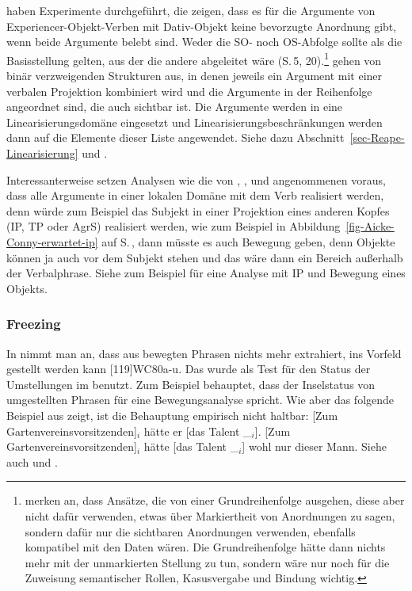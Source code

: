 \begin{exe}
\begin{xlist}
\citet*{MaslochPoppekKiss2024a} haben Experimente durchgeführt, die zeigen, dass es für die
Argumente von Experiencer-Objekt-Verben mit Dativ-Objekt keine bevorzugte Anordnung gibt, wenn beide
Argumente belebt sind. Weder die SO- noch OS-Abfolge sollte als die Basisstellung gelten, aus der
die andere abgeleitet wäre (S.\,5, 20).\footnote{
\citet[]{MaslochPoppekKiss2024a} merken an, dass Ansätze, die von einer Grundreihenfolge
ausgehen, diese aber nicht dafür verwenden, etwas über Markiertheit von Anordnungen zu sagen,
sondern dafür nur die sichtbaren Anordnungen verwenden, ebenfalls kompatibel mit den Daten wären. 
Die Grundreihenfolge hätte dann nichts mehr mit der unmarkierten Stellung zu tun, sondern wäre nur
noch für die Zuweisung semantischer Rollen, Kasusvergabe und Bindung wichtig.%
} \citeauthor{MaslochPoppekKiss2024a} gehen von binär verzweigenden Strukturen aus, in denen jeweils
ein Argument mit einer verbalen Projektion kombiniert wird und die Argumente in der Reihenfolge
angeordnet sind, die auch sichtbar ist. Die Argumente werden in eine Linearisierungsdomäne
eingesetzt und Linearisierungsbeschränkungen werden dann auf die Elemente dieser Liste angewendet.
Siehe dazu Abschnitt~\ref{sec-Reape-Linearisierung} und .
\largerpage

Interessanterweise setzen Analysen wie die von \citet{Kiss2001a},
\citet{Fanselow2001a}, \citet{Mueller2005c} und \citet{MaslochPoppekKiss2024a} angenommenen voraus,
dass alle Argumente in einer lokalen Domäne mit dem Verb realisiert werden, denn würde zum Beispiel
das Subjekt in einer Projektion eines anderen Kopfes (IP, TP oder AgrS) realisiert werden, wie zum Beispiel in
Abbildung~\ref{fig-Aicke-Conny-erwartet-ip} auf S.\,\pageref{fig-Aicke-Conny-erwartet-ip}, dann
müsste es auch Bewegung geben, denn Objekte können ja auch vor dem Subjekt stehen und das wäre dann
ein Bereich außerhalb der Verbalphrase. Siehe zum Beispiel  für
eine Analyse mit IP und Bewegung eines Objekts.


\subsubsection{Freezing}

In \gb nimmt man an, dass aus bewegten Phrasen nichts mehr extrahiert, \dash \zb ins Vorfeld
gestellt werden kann \citep[173]{Ross67a}[119]{WC80a-u}.
Das wurde als Test für den Status der Umstellungen im \mf benutzt. Zum Beispiel \citet{Diesing92a} behauptet,
dass der Inselstatus von umgestellten Phrasen für eine Bewegungsanalyse spricht. Wie aber
das folgende Beispiel aus  zeigt, ist die Behauptung empirisch nicht haltbar:
\eal
\label{ex-Gartenvereinsvorsitzenden}
\ex {}[Zum Gartenvereinsvorsitzenden]$_i$ hätte er [das Talent \_$_i$].
\ex {}[Zum Gartenvereinsvorsitzenden]$_i$ hätte [das Talent \_$_i$] wohl nur dieser Mann.\label{bsp-gartenvereinsvorsitzender}
\zl
Siehe auch  und .


\end{xlist}
\end{exe}
